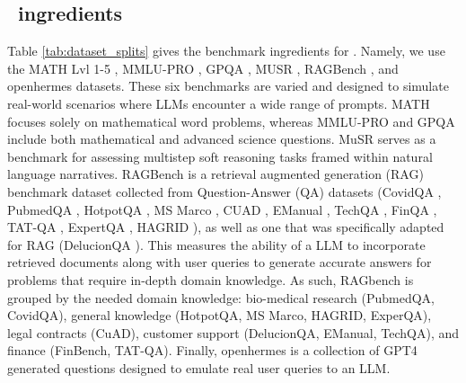 \subsection{\newdata\ ingredients}
Table \ref{tab:dataset_splits} gives the benchmark ingredients for \newdata. Namely, we use the
MATH Lvl 1-5 \citep{hendrycks2021measuringmathematicalproblemsolving}, MMLU-PRO \citep{wang2024mmluprorobustchallengingmultitask}, %
GPQA \citep{rein2023gpqagraduatelevelgoogleproofqa}, MUSR \citep{sprague2023musr}, RAGBench \citep{friel2025ragbenchexplainablebenchmarkretrievalaugmented}, and openhermes \citep{teknium_openhermes_2.5} datasets. These six benchmarks are varied and designed to simulate real-world scenarios where LLMs encounter a wide range of prompts. MATH focuses solely on mathematical word problems, whereas MMLU-PRO and GPQA include both mathematical and advanced science questions. %
MuSR serves as a benchmark for assessing multistep soft reasoning tasks framed within natural language narratives. RAGBench is a retrieval augmented generation (RAG) benchmark dataset collected from Question-Answer (QA) datasets (CovidQA \citep{moller-etal-2020-covidqa}, PubmedQA \citep{jin-etal-2019-pubmedqa}, HotpotQA \citep{yang2018hotpotqa}, MS Marco \citep{nguyen2016msmacro}, CUAD \citep{hendrycks2021cuad}, EManual \citep{nandy-etal-2021-emanual}, TechQA \citep{castelli-etal-2020-techqa}, FinQA \citep{chen-etal-2021-finqa}, TAT-QA \citep{zhu-etal-2021-tatqa}, ExpertQA \citep{malaviya2024expertqa}, HAGRID \citep{kamalloo2023hagrid}), as well as one that was specifically adapted for RAG (DelucionQA \citep{sadat2024delucionqa}). This measures the ability of a LLM to incorporate retrieved documents along with user queries to generate accurate answers for problems that require in-depth domain knowledge. As such, RAGbench is grouped by the needed domain knowledge: bio-medical research (PubmedQA,
CovidQA), general knowledge (HotpotQA, MS Marco, HAGRID, ExperQA), legal contracts (CuAD),
customer support (DelucionQA, EManual, TechQA), and finance (FinBench, TAT-QA). Finally, openhermes is a collection of GPT4 generated questions designed to emulate real user queries to an LLM. 





